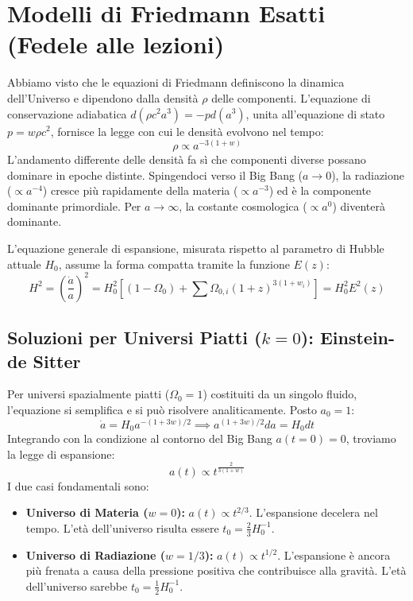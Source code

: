 \documentclass[11pt,a4paper]{report}
\begin{document}
\section{Modelli di Friedmann Esatti (Fedele alle lezioni)}

Abbiamo visto che le equazioni di Friedmann definiscono la dinamica dell'Universo e dipendono dalla densità $\rho$ delle componenti. L'equazione di conservazione adiabatica $d(\rho c^2 a^3) = -p d(a^3)$, unita all'equazione di stato $p = w \rho c^2$, fornisce la legge con cui le densità evolvono nel tempo:
\begin{equation}
\rho \propto a^{-3(1+w)}
\end{equation}
L'andamento differente delle densità fa sì che componenti diverse possano dominare in epoche distinte. Spingendoci verso il Big Bang ($a \to 0$), la radiazione ($\propto a^{-4}$) cresce più rapidamente della materia ($\propto a^{-3}$) ed è la componente dominante primordiale. Per $a \to \infty$, la costante cosmologica ($\propto a^0$) diventerà dominante.

L'equazione generale di espansione, misurata rispetto al parametro di Hubble attuale $H_0$, assume la forma compatta tramite la funzione $E(z)$:
\begin{equation}
H^2 = \left(\frac{\dot{a}}{a}\right)^2 = H_0^2 \left[ (1-\Omega_0) + \sum \Omega_{0,i}(1+z)^{3(1+w_i)} \right] = H_0^2 E^2(z)
\end{equation}

\subsection{Soluzioni per Universi Piatti ($k=0$): Einstein-de Sitter}
Per universi spazialmente piatti ($\Omega_0 = 1$) costituiti da un singolo fluido, l'equazione si semplifica e si può risolvere analiticamente. Posto $a_0 = 1$:
\begin{equation}
\dot{a} = H_0 a^{-(1+3w)/2} \implies a^{(1+3w)/2} da = H_0 dt
\end{equation}
Integrando con la condizione al contorno del Big Bang $a(t=0)=0$, troviamo la legge di espansione:
\begin{equation}
a(t) \propto t^{\frac{2}{3(1+w)}}
\end{equation}
I due casi fondamentali sono:
\begin{itemize}
    \item \textbf{Universo di Materia ($w=0$):} $a(t) \propto t^{2/3}$. L'espansione decelera nel tempo. L'età dell'universo risulta essere $t_0 = \frac{2}{3} H_0^{-1}$.
    \item \textbf{Universo di Radiazione ($w=1/3$):} $a(t) \propto t^{1/2}$. L'espansione è ancora più frenata a causa della pressione positiva che contribuisce alla gravità. L'età dell'universo sarebbe $t_0 = \frac{1}{2} H_0^{-1}$.
\end{itemize}
\end{document}

